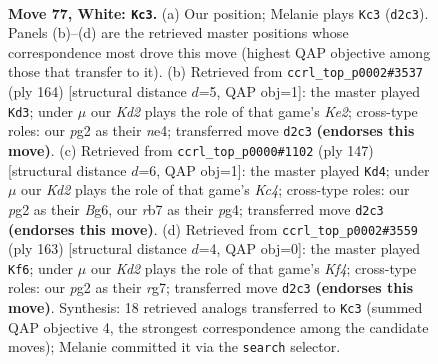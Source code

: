 \documentclass[11pt]{article}
\begin{document}
\clearpage

\begin{figure}[p]\centering
\begin{subfigure}{0.46\textwidth}\centering
\resizebox{\linewidth}{!}{%
\newchessgame
\chessboard[
  setfen={8/1r6/6k1/8/4pp2/8/3K2p1/8 w - - 0 77},
  showmover=false,
  pgfstyle=straightmove, color=movearrow, markmove={d2-c3}
]}
\caption{}
\end{subfigure}\hfill
\begin{subfigure}{0.46\textwidth}\centering
\resizebox{\linewidth}{!}{%
\newchessgame
\chessboard[
  setfen={8/8/4k3/R7/4npp1/8/4K3/8 w - - 16 83},
  showmover=false,
  pgfstyle=straightmove, color=movearrow, markmove={e2-d3}
]}
\caption{}
\end{subfigure}
\\[4pt]
\begin{subfigure}{0.46\textwidth}\centering
\resizebox{\linewidth}{!}{%
\newchessgame
\chessboard[
  setfen={8/8/6b1/2k5/6P1/P7/1N1K4/8 b - - 0 74},
  showmover=false,
  pgfstyle=straightmove, color=movearrow, markmove={c5-d4}
]}
\caption{}
\end{subfigure}\hfill
\begin{subfigure}{0.46\textwidth}\centering
\resizebox{\linewidth}{!}{%
\newchessgame
\chessboard[
  setfen={8/6R1/8/5k2/7P/5P2/7K/1r6 b - - 12 82},
  showmover=false,
  pgfstyle=straightmove, color=movearrow, markmove={f5-f6}
]}
\caption{}
\end{subfigure}
\caption{\textbf{Move 77, White: \texttt{Kc3}.} (a) Our position; Melanie plays \texttt{Kc3} (\texttt{d2c3}). Panels (b)--(d) are the retrieved master positions whose correspondence most drove this move (highest QAP objective among those that transfer to it). (b) Retrieved from \texttt{ccrl\_top\_p0002\#3537} (ply 164) [structural distance $d$=5, QAP obj=1]: the master played \texttt{Kd3}; under $\mu$ our \emph{Kd2} plays the role of that game's \emph{Ke2}; cross-type roles: our \emph{p}g2 as their \emph{n}e4; transferred move \texttt{d2c3} \textbf{(endorses this move)}. (c) Retrieved from \texttt{ccrl\_top\_p0000\#1102} (ply 147) [structural distance $d$=6, QAP obj=1]: the master played \texttt{Kd4}; under $\mu$ our \emph{Kd2} plays the role of that game's \emph{Kc4}; cross-type roles: our \emph{p}g2 as their \emph{B}g6, our \emph{r}b7 as their \emph{p}g4; transferred move \texttt{d2c3} \textbf{(endorses this move)}. (d) Retrieved from \texttt{ccrl\_top\_p0002\#3559} (ply 163) [structural distance $d$=4, QAP obj=0]: the master played \texttt{Kf6}; under $\mu$ our \emph{Kd2} plays the role of that game's \emph{Kf4}; cross-type roles: our \emph{p}g2 as their \emph{r}g7; transferred move \texttt{d2c3} \textbf{(endorses this move)}. Synthesis: 18 retrieved analogs transferred to \texttt{Kc3} (summed QAP objective 4, the strongest correspondence among the candidate moves); Melanie committed it via the \texttt{search} selector.}
\label{fig:thought-m152}
\end{figure}
\end{document}
